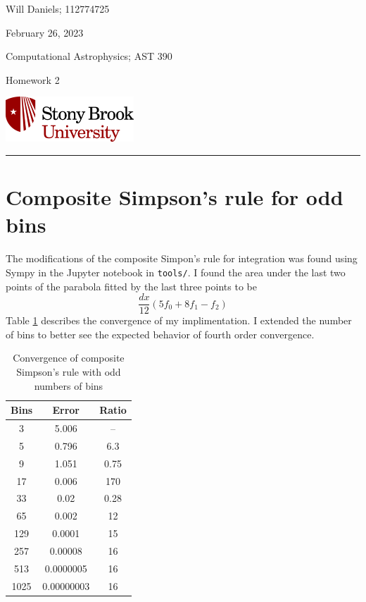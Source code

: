 \documentclass[12pt, letterpaper]{article}
\begin{document}
\noindent
\begin{minipage}{0.5\textwidth}
    Will Daniels; 112774725

    February 26, 2023

    Computational Astrophysics; AST 390

    Homework 2
\end{minipage}
%
\begin{minipage}{0.5\textwidth}
    \begin{flushright}
        \includegraphics[height = 48pt]{../../LatexAssets/SBULogoStacked}
    \end{flushright}
\end{minipage}
\noindent
\rule{\textwidth}{1pt}

\tableofcontents

\section{Composite Simpson's rule for odd bins}
The modifications of the composite Simpon's rule for integration was found
using Sympy in the Jupyter notebook in \verb|tools/|. I found the area under
the last two points of the parabola fitted by the last three points to be
\begin{equation}
  \frac{dx}{12} \left( 5f_0 + 8f_1 - f_2 \right)
\end{equation}
Table \ref{tab:converge} describes the convergence of my implimentation. I
extended the number of bins to better see the expected behavior of fourth order
convergence.

\begin{table}[!b]
    \centering
    \caption{Convergence of composite Simpson's rule with odd numbers of bins}
    \label{tab:converge}
    \begin{tabular}{ c c c }
    \hline\hline
    Bins & Error & Ratio\\
    \hline
    3 & 5.006 & -- \\
    5 & 0.796 & 6.3 \\
    9 & 1.051 & 0.75 \\
    17 & 0.006 & 170 \\
    33 & 0.02 & 0.28 \\
    65 & 0.002 & 12 \\
    129 & 0.0001 & 15 \\
    257 & 0.00008 & 16 \\
    513 & 0.0000005 & 16 \\
    1025 & 0.00000003 & 16 \\
    \hline\hline
    \end{tabular}
\end{table}
\end{document}
